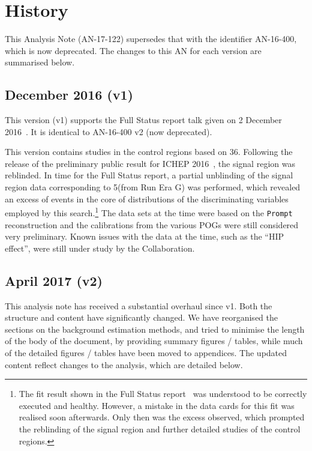 
\section{History}
\label{sec:history}

This Analysis Note (AN-17-122) supersedes that with the identifier
AN-16-400, which is now deprecated. The changes to this AN for each
version are summarised below.

\subsection{December 2016 (v1)}

This version (v1) supports the Full Status report talk given on
2 December 2016~\cite{fullstatus}. It is identical to
AN-16-400 v2 (now deprecated).

This version contains studies in the control regions based on
36\fbinv. Following the release of the preliminary public result for
ICHEP 2016~\cite{CMS-PAS-SUS-16-016}, the signal region was
reblinded. In time for the Full Status report, a partial unblinding of
the signal region data corresponding to 5\fbinv (from Run Era G) was
performed, which revealed an excess of events in the core of
distributions of the discriminating variables employed by this
search.\footnote{The fit result shown in the Full Status
  report~\cite{fullstatus} was understood to be correctly executed and
  healthy. However, a mistake in the data cards for this fit was
  realised soon afterwards. Only then was the excess observed, which
  prompted the reblinding of the signal region and further detailed
  studies of the control regions.}  The data sets at the time were
based on the \verb!Prompt!  reconstruction and the calibrations from
the various POGs were still considered very preliminary. Known issues
with the data at the time, such as the ``HIP effect'', were still
under study by the Collaboration.

\subsection{April 2017 (v2)}

This analysis note has received a substantial overhaul since v1. Both
the structure and content have significantly changed.  We have
reorganised the sections on the background estimation methods, and
tried to minimise the length of the body of the document, by providing
summary figures / tables, while much of the detailed figures / tables
have been moved to appendices. The updated content reflect changes to
the analysis, which are detailed below.

